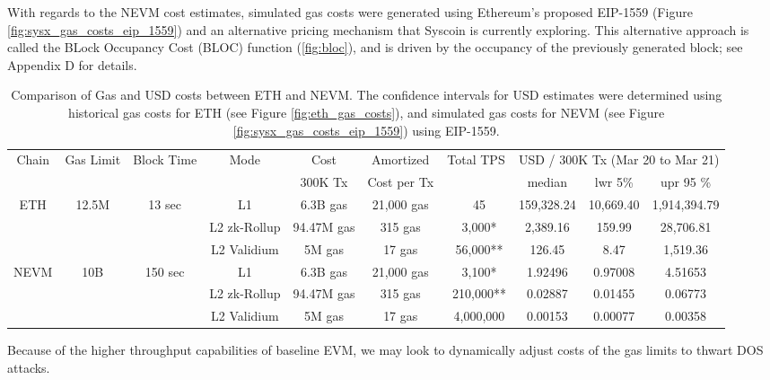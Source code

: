 \documentclass[peerreview]{ieeesyscoin}
\begin{document}
With regards to the NEVM cost estimates, simulated gas costs were generated using Ethereum's proposed EIP-1559 (Figure \ref{fig:sysx_gas_costs_eip_1559}) and an alternative pricing mechanism that Syscoin is currently exploring. This alternative approach is called the BLock Occupancy Cost (BLOC) function (\ref{fig:bloc}), and is driven by the occupancy of the previously generated block; see Appendix D for details.

\begin{table}[h!]
\centering
\begin{tabular}{ |c|c|c|c|c|c|c|c|c|c|   } 
\hline
Chain & Gas  Limit & Block Time & Mode & Cost  & Amortized  & Total TPS & \multicolumn{3}{|c|}{USD / 300K Tx (Mar 20 to Mar 21) } \\
 &  &  &  &  300K Tx  & Cost per Tx  &  & median & lwr 5\% &  upr 95 \% \\ 
\hline
\multirow{3}{*}{ETH} & \multirow{3}{*}{12.5M} & \multirow{3}{*}{13 sec} & L1 & 6.3B gas  & 21,000 gas  & ~45 & 159,328.24 & 10,669.40  & 1,914,394.79  \\ 
\multirow{3}{*}{} & \multirow{3}{*}{} & \multirow{3}{*}{} & L2 zk-Rollup & 94.47M gas  & 315 gas & ~3,000* & 2,389.16 & 159.99  & 28,706.81 \\ 
\multirow{3}{*}{} & \multirow{3}{*}{} & \multirow{3}{*}{} & L2 Validium  & 5M gas  & 17 gas & ~56,000** & 126.45 & 8.47  & 1,519.36 \\ 
\hline

\multirow{3}{*}{NEVM} & \multirow{3}{*}{10B} & \multirow{3}{*}{150 sec} & L1 & 6.3B gas  & 21,000 gas  & ~3,100*& 1.92496 & 0.97008 & 4.51653 \\ 
\multirow{3}{*}{} & \multirow{3}{*}{} & \multirow{3}{*}{} & L2 zk-Rollup & 94.47M gas  & 315 gas & ~210,000** & 0.02887 & 0.01455 & 0.06773 \\ 
\multirow{3}{*}{} & \multirow{3}{*}{} & \multirow{3}{*}{} & L2 Validium  & 5M gas  & 17 gas & ~4,000,000 & 0.00153 & 0.00077  & 0.00358 \\ 
\hline

\end{tabular}
\caption{Comparison of Gas and USD costs between ETH and NEVM. The confidence intervals for USD estimates were determined using historical gas costs for ETH (see Figure \ref{fig:eth_gas_costs}), and simulated gas costs for NEVM (see Figure \ref{fig:sysx_gas_costs_eip_1559}) using EIP-1559.}
\label{table:gas_cost_estimates}
\end{table}

Because of the higher throughput capabilities of baseline EVM, we may look to dynamically adjust costs of the gas limits \cite{Che17} to thwart DOS attacks.
\end{document}
